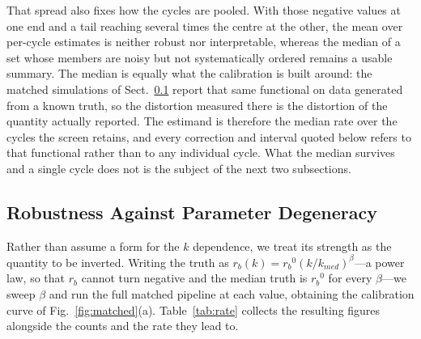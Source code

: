 \documentclass[sigconf]{acmart}
\newcommand{\rb}{\ensuremath{r_{b}}}
\begin{document}
That spread also fixes how the cycles are pooled. With those negative
values at one end and a tail reaching several times the centre at the
other, the mean over per-cycle estimates is neither robust nor
interpretable, whereas the median of a set whose members are noisy but
not systematically ordered remains a usable summary. The median is
equally what the calibration is built around: the matched simulations
of Sect.~\ref{sec:degen} report that same functional on data generated
from a known truth, so the distortion measured there is the distortion
of the quantity actually reported. The estimand is therefore the median
rate over the cycles the screen retains, and every correction and
interval quoted below refers to that functional rather than to any
individual cycle. What the median survives and a single cycle does not
is the subject of the next two subsections.

\subsection{Robustness Against Parameter Degeneracy}
\label{sec:degen}

Rather than assume a form for the $k$ dependence, we treat its strength
as the quantity to be inverted. Writing the truth as
$\rb(k)=\rb^{0}(k/k_{med})^{\beta}$---a power law, so that \rb{} cannot
turn negative and the median truth is $\rb^{0}$ for every
$\beta$---we sweep $\beta$ and run the full matched pipeline at each
value, obtaining the calibration curve of Fig.~\ref{fig:matched}(a).
Table~\ref{tab:rate} collects the resulting figures alongside the
counts and the rate they lead to.
\end{document}
